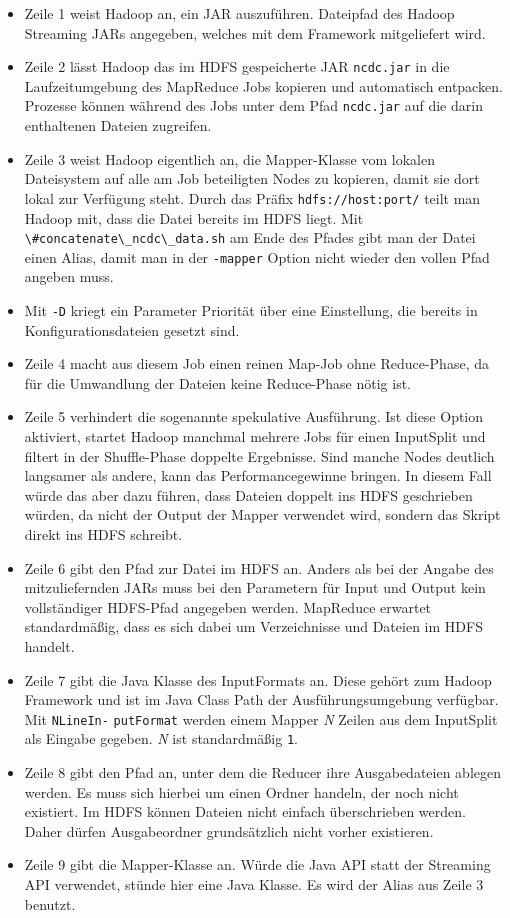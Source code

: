 \begin{itemize}
    \item Zeile 1 weist Hadoop an, ein JAR auszuführen. Dateipfad des Hadoop Streaming JARs angegeben, welches mit dem Framework mitgeliefert wird.
    \item Zeile 2 lässt Hadoop das im HDFS gespeicherte JAR \verb|ncdc.jar| in die Laufzeitumgebung des MapReduce Jobs kopieren und automatisch entpacken. Prozesse können während des Jobs unter dem Pfad \verb|ncdc.jar| auf die darin enthaltenen Dateien zugreifen.
    \item Zeile 3 weist Hadoop eigentlich an, die Mapper-Klasse vom lokalen Dateisystem auf alle am Job beteiligten Nodes zu kopieren, damit sie dort lokal zur Verfügung steht. Durch das Präfix \verb|hdfs://host:port/| teilt man Hadoop mit, dass die Datei bereits im HDFS liegt. Mit \verb|\#concatenate\_ncdc\_data.sh| am Ende des Pfades gibt man der Datei einen Alias, damit man in der \verb|-mapper| Option nicht wieder den vollen Pfad angeben muss.      
    \item Mit \verb|-D| kriegt ein Parameter Priorität über eine Einstellung, die bereits in Konfigurationsdateien gesetzt sind.
    \item Zeile 4 macht aus diesem Job einen reinen Map-Job ohne Reduce-Phase, da für die Umwandlung der Dateien keine Reduce-Phase nötig ist.
    \item Zeile 5 verhindert die sogenannte spekulative Ausführung. Ist diese Option aktiviert, startet Hadoop manchmal mehrere Jobs für einen InputSplit und filtert in der Shuffle-Phase doppelte Ergebnisse. Sind manche Nodes deutlich langsamer als andere, kann das Performancegewinne bringen. In diesem Fall würde das aber dazu führen, dass Dateien doppelt ins HDFS geschrieben würden, da nicht der Output der Mapper verwendet wird, sondern das Skript direkt ins HDFS schreibt.
    \item Zeile 6 gibt den Pfad zur Datei im HDFS an. Anders als bei der Angabe des mitzuliefernden JARs muss bei den Parametern für Input und Output kein vollständiger HDFS-Pfad angegeben werden. MapReduce erwartet standardmäßig, dass es sich dabei um Verzeichnisse und Dateien im HDFS handelt.
    \item Zeile 7 gibt die Java Klasse des InputFormats an. Diese gehört zum Hadoop Framework und ist im Java Class Path der Ausführungsumgebung verfügbar. Mit \verb|NLineIn-| \verb|putFormat| werden einem Mapper \textit{N} Zeilen aus dem InputSplit als Eingabe gegeben. \textit{N} ist standardmäßig \verb|1|. 
    \item Zeile 8 gibt den Pfad an, unter dem die Reducer ihre Ausgabedateien ablegen werden. Es muss sich hierbei um einen Ordner handeln, der noch nicht existiert. Im HDFS können Dateien nicht einfach überschrieben werden. Daher dürfen Ausgabeordner grundsätzlich nicht vorher existieren.
    \item Zeile 9 gibt die Mapper-Klasse an. Würde die Java API statt der Streaming API verwendet, stünde hier eine Java Klasse. Es wird der Alias aus Zeile 3 benutzt.
\end{itemize}
\pagebreak

